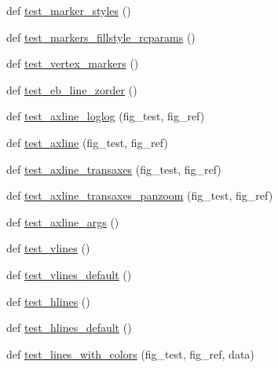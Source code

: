 \begin{DoxyCompactItemize}
\item 
def \hyperlink{namespacematplotlib_1_1tests_1_1test__axes_a856e70e5108912af244976cf2e5258e6}{test\+\_\+marker\+\_\+styles} ()
\item 
def \hyperlink{namespacematplotlib_1_1tests_1_1test__axes_a697d56b06213b5f1ee5c8a9c1ea03331}{test\+\_\+markers\+\_\+fillstyle\+\_\+rcparams} ()
\item 
def \hyperlink{namespacematplotlib_1_1tests_1_1test__axes_ac8cb613e0e9752cdea406bcfc6928f0a}{test\+\_\+vertex\+\_\+markers} ()
\item 
def \hyperlink{namespacematplotlib_1_1tests_1_1test__axes_af61d0dd881808ac75982820cc39e404c}{test\+\_\+eb\+\_\+line\+\_\+zorder} ()
\item 
def \hyperlink{namespacematplotlib_1_1tests_1_1test__axes_a11e8baad876717638b8d478ad8437029}{test\+\_\+axline\+\_\+loglog} (fig\+\_\+test, fig\+\_\+ref)
\item 
def \hyperlink{namespacematplotlib_1_1tests_1_1test__axes_a00e1d0c9834335965b98296e2951150e}{test\+\_\+axline} (fig\+\_\+test, fig\+\_\+ref)
\item 
def \hyperlink{namespacematplotlib_1_1tests_1_1test__axes_aafe6d43c03e0d51a67d4d9497ecdae64}{test\+\_\+axline\+\_\+transaxes} (fig\+\_\+test, fig\+\_\+ref)
\item 
def \hyperlink{namespacematplotlib_1_1tests_1_1test__axes_a83dae1c3ee55ec62711b43e2235c64fc}{test\+\_\+axline\+\_\+transaxes\+\_\+panzoom} (fig\+\_\+test, fig\+\_\+ref)
\item 
def \hyperlink{namespacematplotlib_1_1tests_1_1test__axes_a2d85e3d82b4ed42ca431bab52179ff1c}{test\+\_\+axline\+\_\+args} ()
\item 
def \hyperlink{namespacematplotlib_1_1tests_1_1test__axes_a28d77156e0ae80ae77fb5295cf1091d3}{test\+\_\+vlines} ()
\item 
def \hyperlink{namespacematplotlib_1_1tests_1_1test__axes_a670c596660a6e0498f7cb98c86cb130c}{test\+\_\+vlines\+\_\+default} ()
\item 
def \hyperlink{namespacematplotlib_1_1tests_1_1test__axes_aeb6cb031b3dc19be485303a057185ba9}{test\+\_\+hlines} ()
\item 
def \hyperlink{namespacematplotlib_1_1tests_1_1test__axes_a7e9cb682d1cff37c53c670b50f569ddf}{test\+\_\+hlines\+\_\+default} ()
\item 
def \hyperlink{namespacematplotlib_1_1tests_1_1test__axes_a9b9c40f83b1159ebd122f9c75a8a47bc}{test\+\_\+lines\+\_\+with\+\_\+colors} (fig\+\_\+test, fig\+\_\+ref, data)
\item 

\end{DoxyCompactItemize}
